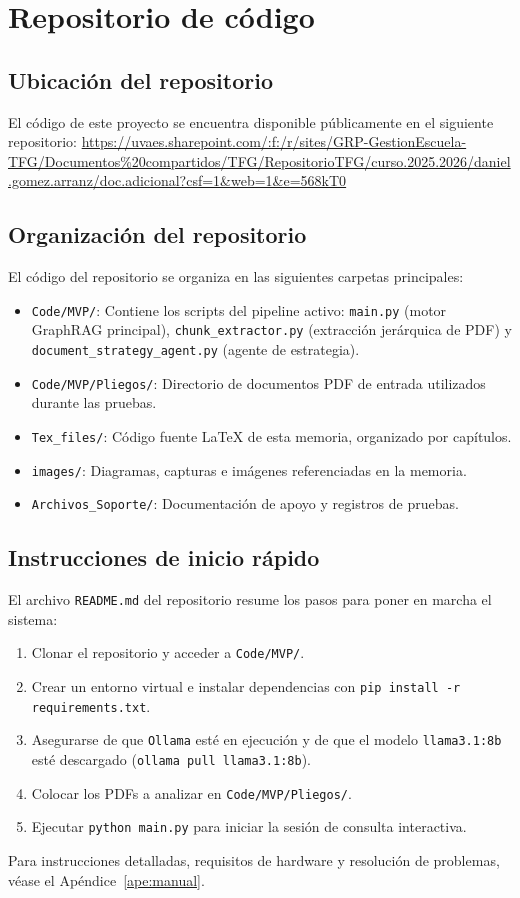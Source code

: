 ﻿\appendix

\chapter{Repositorio de código}
\label{anexo:repositorio}

\section{Ubicación del repositorio}
El código de este proyecto se encuentra disponible públicamente en el
siguiente repositorio:
\url{https://uvaes.sharepoint.com/:f:/r/sites/GRP-GestionEscuela-TFG/Documentos%20compartidos/TFG/RepositorioTFG/curso.2025.2026/daniel.gomez.arranz/doc.adicional?csf=1&web=1&e=568kT0}

\section{Organización del repositorio}
El código del repositorio se organiza en las siguientes carpetas principales:
\begin{itemize}
    \item \texttt{Code/MVP/}: Contiene los scripts del pipeline activo: \texttt{main.py} (motor GraphRAG principal), \texttt{chunk\_extractor.py} (extracción jerárquica de PDF) y \texttt{document\_strategy\_agent.py} (agente de estrategia).
    \item \texttt{Code/MVP/Pliegos/}: Directorio de documentos PDF de entrada utilizados durante las pruebas.
    \item \texttt{Tex\_files/}: Código fuente \LaTeX{} de esta memoria, organizado por capítulos.
    \item \texttt{images/}: Diagramas, capturas e imágenes referenciadas en la memoria.
    \item \texttt{Archivos\_Soporte/}: Documentación de apoyo y registros de pruebas.
\end{itemize}

\section{Instrucciones de inicio rápido}
El archivo \texttt{README.md} del repositorio resume los pasos para poner en marcha el sistema:
\begin{enumerate}
    \item Clonar el repositorio y acceder a \texttt{Code/MVP/}.
    \item Crear un entorno virtual e instalar dependencias con \texttt{pip install -r requirements.txt}.
    \item Asegurarse de que \texttt{Ollama} esté en ejecución y de que el modelo \texttt{llama3.1:8b} esté descargado (\texttt{ollama pull llama3.1:8b}).
    \item Colocar los PDFs a analizar en \texttt{Code/MVP/Pliegos/}.
    \item Ejecutar \texttt{python main.py} para iniciar la sesión de consulta interactiva.
\end{enumerate}
Para instrucciones detalladas, requisitos de hardware y resolución de problemas, véase el Apéndice~\ref{ape:manual}.

